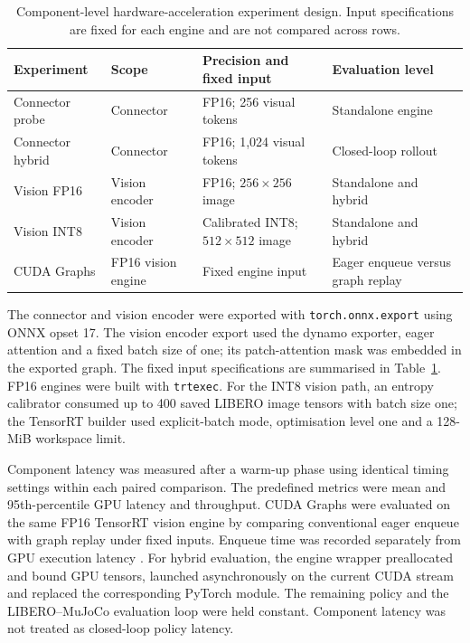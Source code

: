 \begin{table}
  \centering
  \caption{Component-level hardware-acceleration experiment design. Input
  specifications are fixed for each engine and are not compared across rows.}
  \label{tab:hardware_experiment_design}
  \small
  \setlength{\tabcolsep}{3pt}
  \renewcommand{\arraystretch}{1.12}
  \begin{tabular}{@{}p{}p{}p{}p{}@{}}
    \toprule
    Experiment & Scope & Precision and fixed input & Evaluation level \\
    \midrule
    Connector probe & Connector & FP16; 256 visual tokens & Standalone engine \\
    Connector hybrid & Connector & FP16; 1,024 visual tokens & Closed-loop rollout \\
    Vision FP16 & Vision encoder & FP16; \(256\times256\) image & Standalone and hybrid \\
    Vision INT8 & Vision encoder & Calibrated INT8; \(512\times512\) image & Standalone and hybrid \\
    CUDA Graphs & FP16 vision engine & Fixed engine input & Eager enqueue versus graph replay \\
    \bottomrule
  \end{tabular}
\end{table}

The connector and vision encoder were exported with \texttt{torch.onnx.export}
using ONNX opset 17. The vision encoder export used the dynamo exporter, eager
attention and a fixed batch size of one; its patch-attention mask was embedded
in the exported graph. The fixed input specifications are summarised in
Table~\ref{tab:hardware_experiment_design}. FP16 engines were built with
\texttt{trtexec}. For the INT8 vision path, an entropy calibrator consumed up
to 400 saved LIBERO image tensors with batch size one; the TensorRT builder
used explicit-batch mode, optimisation level one and a 128-MiB workspace
limit.

Component latency was measured after a warm-up phase using identical timing
settings within each paired comparison. The predefined metrics were mean and
95th-percentile GPU latency and throughput. CUDA Graphs were evaluated on the
same FP16 TensorRT vision engine by comparing conventional eager enqueue with
graph replay under fixed inputs. Enqueue time was recorded separately from GPU
execution latency \cite{nvidia_tensorrt,nvidia_cuda_graphs}. For hybrid
evaluation, the engine wrapper preallocated and bound GPU tensors, launched
asynchronously on the current CUDA stream and replaced the corresponding
PyTorch module. The remaining policy and the LIBERO--MuJoCo evaluation loop
were held constant. Component latency was not treated as closed-loop policy
latency.

